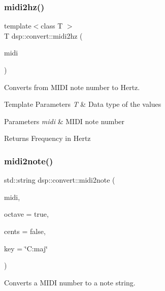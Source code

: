 \subsubsection{\texorpdfstring{midi2hz()}{midi2hz()}}
{\footnotesize\ttfamily template$<$class T $>$ \\
T dsp\+::convert\+::midi2hz (\begin{DoxyParamCaption}\item[{T}]{midi }\end{DoxyParamCaption})}



Converts from M\+I\+DI note number to Hertz. 


\begin{DoxyTemplParams}{Template Parameters}
{\em T} & Data type of the values \\
\hline
\end{DoxyTemplParams}

\begin{DoxyParams}{Parameters}
{\em midi} & M\+I\+DI note number \\
\hline
\end{DoxyParams}
\begin{DoxyReturn}{Returns}
Frequency in Hertz 
\end{DoxyReturn}
\mbox{\label{namespacedsp_1_1convert_a593b176de512466768766cfa99ef7f6e}} 
\subsubsection{\texorpdfstring{midi2note()}{midi2note()}}
{\footnotesize\ttfamily std\+::string dsp\+::convert\+::midi2note (\begin{DoxyParamCaption}\item[{double}]{midi,  }\item[{bool}]{octave = {\ttfamily true},  }\item[{bool}]{cents = {\ttfamily false},  }\item[{std\+::string}]{key = {\ttfamily \char`\"{}C\+:maj\char`\"{}} }\end{DoxyParamCaption})}



Converts a M\+I\+DI number to a note string. 


